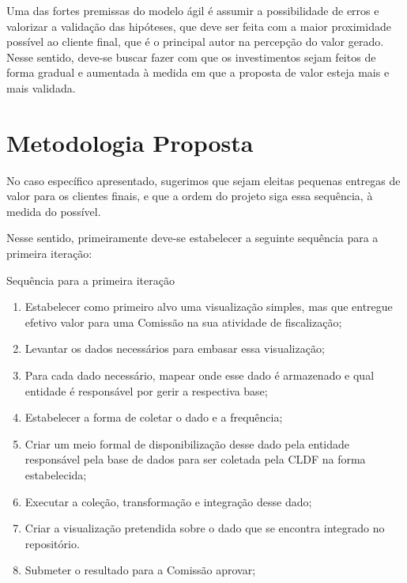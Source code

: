 
Uma das fortes premissas do modelo ágil é assumir a possibilidade de erros e valorizar a validação das hipóteses, que deve ser feita com a maior proximidade possível ao cliente final, que é o principal autor na percepção do valor gerado. Nesse sentido, deve-se buscar fazer com que os investimentos sejam feitos de forma gradual e aumentada à medida em que a proposta de valor esteja mais e mais validada.


\section{Metodologia Proposta}
\label{sec-implantacao}

No caso específico apresentado, sugerimos que sejam eleitas pequenas entregas de valor para os clientes finais, e que a ordem do projeto siga essa sequência, à medida do possível. 

Nesse sentido, primeiramente deve-se estabelecer a seguinte sequência para a primeira iteração:


\begin{env-destaque}{Sequência para a primeira iteração}
\begin{enumerate}
    \item Estabelecer como primeiro alvo uma  visualização simples, mas que entregue efetivo valor para uma Comissão na sua atividade de fiscalização;
    \item Levantar os dados necessários para embasar essa visualização;
    \item Para cada dado necessário, mapear onde esse dado é armazenado e qual entidade é responsável por gerir a respectiva base;
    \item Estabelecer a forma de coletar o dado e a frequência;
    \item Criar um meio formal de disponibilização desse dado pela entidade responsável pela base de dados para ser coletada pela CLDF na forma estabelecida;
    \item Executar a coleção, transformação e integração desse dado;
    \item Criar a visualização pretendida sobre o dado que se encontra integrado no repositório.
    \item Submeter o resultado para a Comissão aprovar; 
\end{enumerate}
\end{env-destaque}


